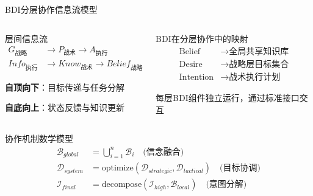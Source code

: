 \documentclass[
10pt,
aspectratio=169,
]{beamer}
\begin{document}
\begin{frame}{BDI分层协作信息流模型}
    \begin{columns}
        \begin{column}{0.5\textwidth}
            \begin{exampleblock}{层间信息流}
                \begin{align}
                G_{战略} &\rightarrow P_{战术} \rightarrow A_{执行} \\
                Info_{执行} &\rightarrow Know_{战术} \rightarrow Belief_{战略}
                \end{align}
                
                \textbf{自顶向下}：目标传递与任务分解
                
                \textbf{自底向上}：状态反馈与知识更新
            \end{exampleblock}
        \end{column}
        \begin{column}{0.5\textwidth}
            \begin{alertblock}{BDI在分层协作中的映射}
                \begin{align}
                \text{Belief} &\rightarrow \text{全局共享知识库} \\
                \text{Desire} &\rightarrow \text{战略层目标集合} \\
                \text{Intention} &\rightarrow \text{战术执行计划}
                \end{align}
                
                每层BDI组件独立运行，通过标准接口交互
            \end{alertblock}
        \end{column}
    \end{columns}
    
    \begin{block}{协作机制数学模型}
        \begin{align}
        \mathcal{B}_{global} &= \bigcup_{i=1}^{n} \mathcal{B}_i \quad \text{(信念融合)} \\
        \mathcal{D}_{system} &= \text{optimize}(\mathcal{D}_{strategic}, \mathcal{D}_{tactical}) \quad \text{(目标协调)} \\
        \mathcal{I}_{final} &= \text{decompose}(\mathcal{I}_{high}, \mathcal{B}_{local}) \quad \text{(意图分解)}
        \end{align}
    \end{block}
\end{frame}
\end{document}
